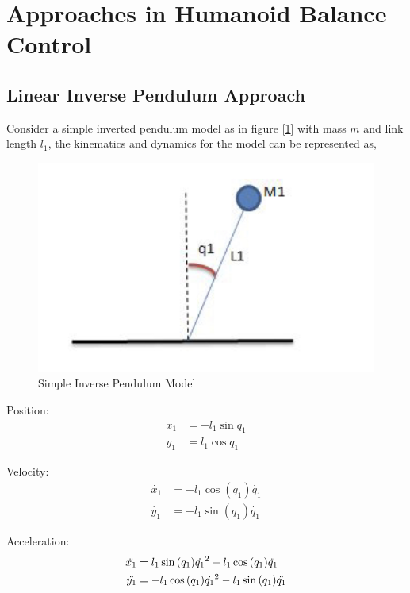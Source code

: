 \section{Approaches in Humanoid Balance Control}
\subsection{Linear Inverse Pendulum Approach}


Consider a simple inverted pendulum model as in figure [\ref{ipm}] with mass $m$ and link length $l_1$, the kinematics and dynamics for the model can be represented as,

\begin{figure}[h!]
    \centering
    \includegraphics[scale=.15]{images/ipm.jpeg}\hfill
    \caption{Simple Inverse Pendulum Model}\hfill
    \label{ipm}
\end{figure}

Position:
\begin{equation}
\begin{split}
    x_1 &= -l_1\sin{q_1} \\
    y_1 &= l_1\cos{q_1}
\end{split}
\end{equation}

Velocity:
\begin{equation}
\begin{split}
    \Dot{x_1} &= -l_1\cos({q_1})\Dot{q_1} \\
    \Dot{y_1} &= -l_1\sin({q_1})\Dot{q_1}
\end{split}
\end{equation}

Acceleration:
\begin{equation}
\begin{split}
    \Ddot{x_1} &= l_1 \sin{(q_1)}\Dot{q_1}^2 - l_1\cos{(q_1)}\Ddot{q_1} \\
    \Ddot{y_1} &= -l_1 \cos{(q_1)}\Dot{q_1}^2 - l_1 \sin{(q_1)}\Ddot{q_1}
\end{split}
\end{equation}

